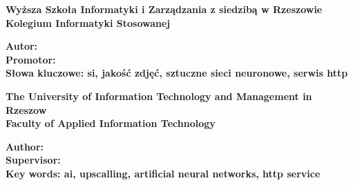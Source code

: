 ﻿%


\noindent
{\footnotesize{}\textbf{Wyższa Szkoła Informatyki i Zarządzania z siedzibą w Rzeszowie\\
Kolegium Informatyki Stosowanej}}
\vspace{30pt}

\vspace{30pt}
\noindent
\textbf{Autor: \autor
\\Promotor: \promotor
\\Słowa kluczowe: si, jakość zdjęć, sztuczne sieci neuronowe, serwis http}
\vspace{40pt}

\noindent
{\footnotesize{}\textbf{The University of Information Technology and Management in Rzeszow\\
Faculty of Applied Information Technology}}
\vspace{30pt}

\vspace{30pt}
\noindent
\textbf{Author: \autor
\\Supervisor: \promotor
\\Key words: ai, upscalling, artificial neural networks, http service}

